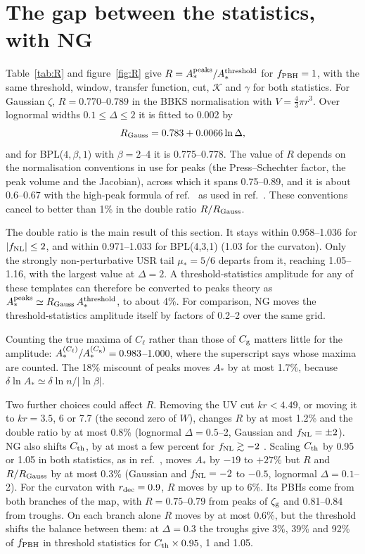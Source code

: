 \documentclass[a4paper,11pt]{article}
\newcommand{\Cg}{C_{\rm g}}
\newcommand{\Cl}{C_{\ell}}
\newcommand{\zg}{\zeta_{\rm g}}
\newcommand{\fnl}{f_{\rm NL}}
\newcommand{\fpbh}{f_{\rm PBH}}
\begin{document}
\section{The gap between the statistics, with NG}\label{sec:R}

Table~\ref{tab:R} and figure~\ref{fig:R} give $R=A_*^{\rm peaks}/A_*^{\rm threshold}$ for
$\fpbh=1$, with the same threshold, window, transfer function, cut, $\mathcal K$ and $\gamma$ for
both statistics. For Gaussian $\zeta$, $R=0.770$--$0.789$ in the BBKS normalisation with
$V=\frac43\pi r^3$. Over lognormal widths $0.1\le\Delta\le2$ it is fitted to 0.002 by
\begin{equation}
R_{\rm Gauss}=0.783+0.0066\ln\Delta,
\label{eq:RGauss}
\end{equation}
and for BPL($4,\beta,1$) with $\beta=2$--4 it is 0.775--0.778. The value of $R$ depends on the
normalisation conventions in use for peaks (the Press--Schechter factor, the peak volume and the
Jacobian), across which it spans 0.75--0.89, and it is about 0.6--0.67 with the high-peak formula
of ref.~\cite{Iovino24} as used in ref.~\cite{Blas26}. These conventions cancel to better than 1\%
in the double ratio $R/R_{\rm Gauss}$.

The double ratio is the main result of this section. It stays within 0.958--1.036 for
$|\fnl|\le2$, and within 0.971--1.033 for BPL(4,3,1) (1.03 for the curvaton). Only the strongly
non-perturbative USR tail $\mu_*=5/6$ departs from it, reaching 1.05--1.16, with the largest
value at $\Delta=2$. A threshold-statistics amplitude for any of these templates can therefore be
converted to peaks theory as $A_*^{\rm peaks}\simeq R_{\rm Gauss}\,A_*^{\rm threshold}$, to about
4\%. For comparison, NG moves the threshold-statistics amplitude itself by factors of 0.2--2 over
the same grid.

Counting the true maxima of $\Cl$ rather than those of $\Cg$ matters little for the amplitude:
$A_*^{(\Cl)}/A_*^{(\Cg)}=0.983$--1.000, where the superscript says whose maxima are counted. The
18\% miscount of peaks moves $A_*$ by at most 1.7\%, because $\delta\ln A_*\simeq\delta\ln n/|\ln\beta|$.

Two further choices could affect $R$. Removing the UV cut $kr<4.49$, or moving it to $kr=3.5$, 6
or 7.7 (the second zero of $W$), changes $R$ by at most 1.2\% and the double ratio by at most
0.8\% (lognormal $\Delta=0.5$--2, Gaussian and $\fnl=\pm2$). NG also shifts $C_{\rm th}$, by at most
a few percent for $\fnl\gtrsim-2$ \cite{KMR19,ETYY22,Iovino24}. Scaling $C_{\rm th}$ by 0.95 or 1.05
in both statistics, as in ref.~\cite{Iovino24}, moves $A_*$ by $-19$ to $+27\%$ but $R$ and
$R/R_{\rm Gauss}$ by at most 0.3\% (Gaussian and $\fnl=-2$ to $-0.5$, lognormal $\Delta=0.1$--2).
For the curvaton with $r_{\rm dec}=0.9$, $R$ moves by up to 6\%. Its PBHs come from both branches
of the map, with $R=0.75$--0.79 from peaks of $\zg$ and 0.81--0.84 from troughs. On each branch
alone $R$ moves by at most 0.6\%, but the threshold shifts the balance between them: at
$\Delta=0.3$ the troughs give 3\%, 39\% and 92\% of $\fpbh$ in threshold statistics for
$C_{\rm th}\times0.95$, 1 and 1.05.
\end{document}
